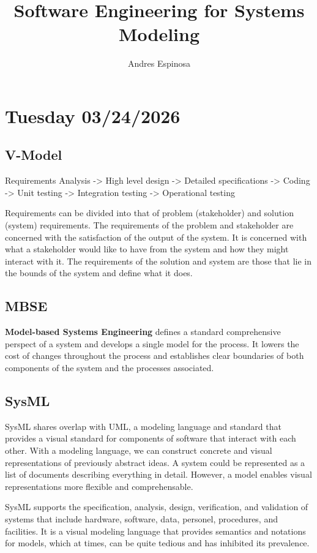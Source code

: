 \documentclass[11pt]{article}
\title{Software Engineering for Systems Modeling}
\author{Andres Espinosa}
\begin{document}
\pgfplotsset{compat=1.18}
\maketitle

\tableofcontents
\section{Tuesday 03/24/2026}

\subsection{V-Model}

Requirements Analysis -> High level design -> Detailed specifications -> Coding -> Unit testing -> Integration testing -> Operational testing

Requirements can be divided into that of problem (stakeholder) and solution (system) requirements.
The requirements of the problem and stakeholder are concerned with the satisfaction of the output of the system.
It is concerned with what a stakeholder would like to have from the system and how they might interact with it.
The requirements of the solution and system are those that lie in the bounds of the system and define what it does.

\subsection{MBSE}
\textbf{Model-based Systems Engineering} defines a standard comprehensive perspect of a system and develops a single model for the process.
It lowers the cost of changes throughout the process and establishes clear boundaries of both components of the system and the processes associated.

\subsection{SysML}
SysML shares overlap with UML, a modeling language and standard that provides a visual standard for components of software that interact with each other.
With a modeling language, we can construct concrete and visual representations of previously abstract ideas.
A system could be represented as a list of documents describing everything in detail.
However, a model enables visual representations more flexible and comprehensable.

SysML supports the specification, analysis, design, verification, and validation of systems that include hardware, software, data, personel, procedures, and facilities.
It is a visual modeling language that provides semantics and notations for models, which at times, can be quite tedious and has inhibited its prevalence.
\end{document}
